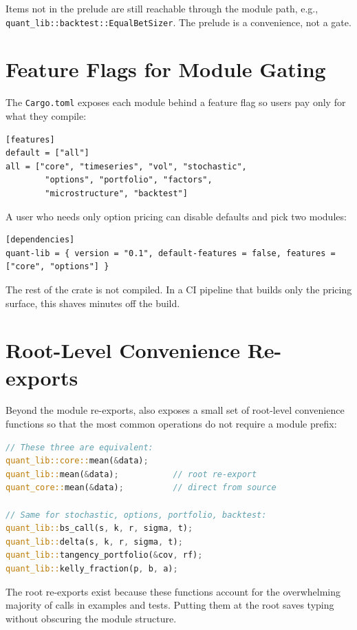Items not in the prelude are still reachable through the module path,
e.g., \texttt{quant\_lib::backtest::EqualBetSizer}. The prelude is a
convenience, not a gate.

\section{Feature Flags for Module Gating}

The  \texttt{Cargo.toml} exposes each module behind a
feature flag so users pay only for what they compile:

\begin{lstlisting}
[features]
default = ["all"]
all = ["core", "timeseries", "vol", "stochastic",
        "options", "portfolio", "factors",
        "microstructure", "backtest"]
\end{lstlisting}

A user who needs only option pricing can disable defaults and pick
two modules:

\begin{lstlisting}
[dependencies]
quant-lib = { version = "0.1", default-features = false, features = ["core", "options"] }
\end{lstlisting}

The rest of the crate is not compiled. In a CI pipeline that builds
only the pricing surface, this shaves minutes off the build.

\section{Root-Level Convenience Re-exports}

Beyond the module re-exports,  also exposes a small
set of root-level convenience functions so that the most common
operations do not require a module prefix:

\begin{lstlisting}[language=Rust]
// These three are equivalent:
quant_lib::core::mean(&data);
quant_lib::mean(&data);           // root re-export
quant_core::mean(&data);          // direct from source

// Same for stochastic, options, portfolio, backtest:
quant_lib::bs_call(s, k, r, sigma, t);
quant_lib::delta(s, k, r, sigma, t);
quant_lib::tangency_portfolio(&cov, rf);
quant_lib::kelly_fraction(p, b, a);
\end{lstlisting}

The root re-exports exist because these functions account for the
overwhelming majority of calls in examples and tests. Putting them at
the root saves typing without obscuring the module structure.

